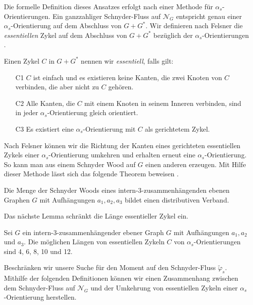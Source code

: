 Die formelle Definition dieses Ansatzes erfolgt nach einer Methode für $\alpha_s$-Orientie\-rungen. Ein ganzzahliger Schnyder-Fluss auf $\mathcal{N}_G$ entspricht genau einer $\alpha_s$-Orientie\-rung auf dem Abschluss von $G+G^*$. Wir definieren nach Felsner die \textit{essentiellen} Zykel auf dem Abschluss von $G+G^*$ bezüglich der $\alpha_s$-Orientierungen \cite{felsner04}.

\begin{definition}
Einen Zykel $C$ in $G+G^*$ nennen wir \textit{essentiell}, falls gilt:
\begin{itemize}
\item[C1] $C$ ist einfach und es existieren keine Kanten, die zwei Knoten von $C$ verbinden, die aber nicht zu $C$ gehören.
\item[C2] Alle Kanten, die $C$ mit einem Knoten in seinem Inneren verbinden, sind in jeder $\alpha_s$-Orientierung gleich orientiert.
\item[C3] Es existiert eine $\alpha_s$-Orientierung mit $C$ als gerichtetem Zykel.
\end{itemize}
\end{definition}

Nach Felsner können wir die Richtung der Kanten eines gerichteten essentiellen Zykels einer $\alpha_s$-Orientierung umkehren und erhalten erneut eine $\alpha_s$-Orientierung. So kann man aus einem Schnyder Wood auf $G$ einen anderen erzeugen. Mit Hilfe dieser Methode lässt sich das folgende Theorem beweisen \cite{felsner04}.
 
\begin{theorem}
Die Menge der Schnyder Woods eines intern-3-zusammenhängenden ebenen Graphen $G$ mit Aufhängungen $a_1,a_2,a_3$ bildet einen distributiven Verband.
\end{theorem}

Das nächste Lemma schränkt die Länge essentieller Zykel ein.

\begin{lemma}
Sei $G$ ein intern-3-zusammenhängender ebener Graph $G$ mit Aufhängungen $a_1,a_2$ und $a_3$. Die möglichen Längen von essentiellen Zykeln $C$ von $\alpha_s$-Orientierungen sind 4, 6, 8, 10 und 12.
\end{lemma}

Beschränken wir unsere Suche für den Moment auf den Schnyder-Fluss $\tilde{\varphi}_s$. Mithilfe der folgenden Definitionen können wir einen Zusammenhang zwischen dem Schnyder-Fluss auf $\mathcal{N}_G$ und der Umkehrung von essentiellen Zykeln einer $\alpha_s$-Orientierung herstellen.

